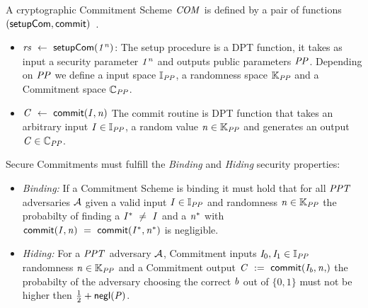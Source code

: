 \begin{definition}\label{def:pre:commitment}
    A cryptographic Commitment Scheme $\mathit{COM}$ is defined by a pair of functions $(\mathsf{setupCom}, \mathsf{commit})$~\cite{bunz2018bulletproofs}.
    \begin{itemize}
        \item $\mathit{rs} ~\leftarrow~ \mathsf{setupCom} (\mathit{1^n})$: The setup procedure is a DPT function, it takes as input a security parameter $\mathit{1^n}$ and outputs public parameters $\mathit{PP}$.
        Depending on $\mathit{PP}$ we define a input space $\mathbb{I}_{\mathit{PP}}$, a randomness space $\mathbb{K}_{\mathit{PP}}$ and a Commitment space $\mathbb{C}_{\mathit{PP}}$.
        \item $\mathit{C} ~\leftarrow~ \mathsf{commit}(\mathit{I}, \mathit{n})$ The commit routine is DPT function that takes an arbitrary input $\mathit{I} \in \mathbb{I}_{\mathit{PP}}$, a random value $\mathit{n} \in \mathbb{K}_{\mathit{PP}}$ and
        generates an output $\mathit{C} \in \mathbb{C}_{\mathit{PP}}$.
    \end{itemize}


    Secure Commitments must fulfill the \emph{Binding} and \emph{Hiding} security properties:
    \begin{itemize}
        \item \textit{Binding:} If a Commitment Scheme is binding it must hold that for all $\mathit{PPT}$ adversaries $\mathcal{A}$ given a valid input $\mathit{I} \in \mathbb{I}_{\mathit{PP}}$
        and randomness $\mathit{n} \in \mathbb{K}_{\mathit{PP}}$ the probabilty of finding a $\mathit{I}^* ~\neq~ \mathit{I}$ and a $\mathit{n}^*$ with
        $\mathsf{commit}(\mathit{I}, \mathit{n}) ~=~ \mathsf{commit}(\mathit{I}^*, \mathit{n}^*)$ is negligible.
        \item \textit{Hiding:} For a $\mathit{PPT}$ adversary $\mathcal{A}$, Commitment inputs $\mathit{I}_0, \mathit{I}_1 \in \mathbb{I}_{\mathit{PP}}$ randomness $\mathit{n} \in
       \mathbb{K}_{\mathit{PP}}$ and a Commitment output $\varCommitment \opAssign \procCommit{\varInput_{\varB}, \varNonce}$ the probabilty of the adversary choosing the correct $\mathit{b}$ out of $\{0,1\}$
        must not be higher then $\frac{1}{2} + \mathsf{negl}(\mathit{P})$. 
    \end{itemize}
\end{definition}

